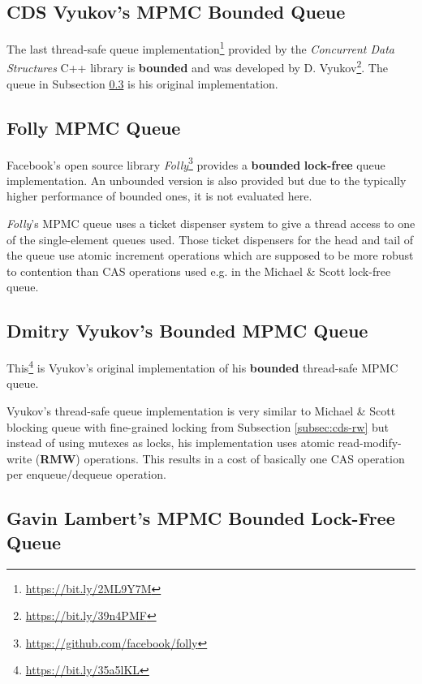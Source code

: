 \subsection[CDS VyukovMPMCCycleQueue]{CDS Vyukov's MPMC Bounded Queue} \label{subsec:cds-vyukovmpmccycle}

	The last thread-safe queue implementation\footnote{\url{https://bit.ly/2ML9Y7M}} provided by the \textit{Concurrent Data Structures} C++ library is \textbf{bounded} and was developed by D. Vyukov\footnote{\url{https://bit.ly/39n4PMF}}. The queue in Subsection \ref{subsec:vyukov} is his original implementation.

\subsection[Folly MPMC Queue]{Folly MPMC Queue} \label{subsec:folly-mpmc}

	Facebook's open source library \textit{Folly}\footnote{\url{https://github.com/facebook/folly}} provides a \textbf{bounded} \textbf{lock-free} queue implementation. An unbounded version is also provided but due to the typically higher performance of bounded ones, it is not evaluated here.
	
	\textit{Folly}'s MPMC queue uses a ticket dispenser system to give a thread access to one of the single-element queues used. Those ticket dispensers for the head and tail of the queue use atomic increment operations which are supposed to be more robust to contention than CAS operations used e.g. in the Michael \& Scott lock-free queue.

\subsection[Dmitry Vyukov's MPMC Queue]{Dmitry Vyukov's Bounded MPMC Queue} \label{subsec:vyukov}

	This\footnote{\url{https://bit.ly/35a5lKL}} is Vyukov's original implementation of his \textbf{bounded} thread-safe MPMC queue.

	Vyukov's thread-safe queue implementation is very similar to Michael \& Scott blocking queue with fine-grained locking from Subsection \ref{subsec:cds-rw} but instead of using mutexes as locks, his implementation uses atomic read-modify-write (\textbf{RMW}) operations. This results in a cost of basically one CAS operation per enqueue/dequeue operation.

\subsection[Gavin Lambert's MPMC Queue]{Gavin Lambert's MPMC Bounded Lock-Free Queue} \label{subsec:lampert}

